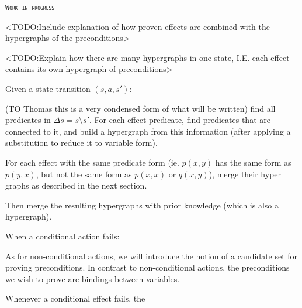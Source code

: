 \documentclass[../Master.tex]{subfiles}
\begin{document}
\textsc{\texttt{Work in progress}}

<TODO:\@ Include explanation of how proven effects are combined with the hypergraphs of the preconditions>

<TODO:\@ Explain how there are many hypergraphs in one state, I.E. each effect contains its own hypergraph of preconditions>

Given a state transition $(s,a,s')$:

(TO Thomas this is a very condensed form of what will be written)
find all predicates in $\Delta s = s \setminus s'$. For each effect predicate, find predicates that are connected to it, and build a hypergraph from this information (after applying a substitution to reduce it to variable form). 

For each effect with the same predicate form (ie. $p(x,y)$ has the same form as $p(y,x)$, but not the same form as $p(x,x)$ or $q(x,y)$), merge their hyper graphs as described in the next section. 

Then merge the resulting hypergraphs with prior knowledge (which is also a hypergraph).

When a conditional action fails:

As for non-conditional actions, we will introduce the notion of a candidate set for proving preconditions. In contrast to non-conditional actions, the preconditions we wish to prove are bindings between variables. 

Whenever a conditional effect fails, the 
\end{document}
